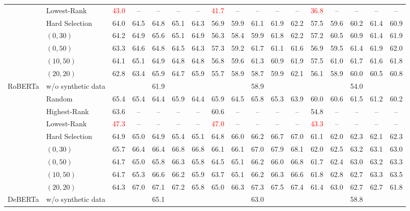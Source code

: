 \begin{table}[t]
\begin{tabular}{llccccccccccccccc}
 & Lowest-Rank & \textcolor{red}{43.0} & -- & -- & -- & -- & \textcolor{red}{41.7} & -- & -- & -- & -- & \textcolor{red}{36.8} & -- & -- & -- & -- \\
 & Hard Selection & 64.0 & 64.5 & 64.8 & 65.1 & 64.3 & 56.9 & 59.9 & 61.1 & 61.9 & 62.2 & 57.5 & 59.6 & 60.2 & 61.4 & 60.9 \\
 & $(0, 30)$ & 64.2 & 64.9 & 65.6 & 65.1 & 64.9 & 56.3 & 58.4 & 59.9 & 61.8 & 62.2 & 57.2 & 60.5 & 60.9 & 61.4 & 61.9 \\
 & $(0, 50)$ & 63.3 & 64.6 & 64.8 & 64.5 & 64.3 & 57.3 & 59.2 & 61.7 & 61.1 & 61.6 & 56.9 & 59.5 & 61.4 & 61.9 & 62.0 \\
 & $(10, 50)$ & 64.1 & 65.1 & 64.9 & 64.8 & 64.8 & 56.8 & 59.6 & 61.3 & 60.9 & 61.9 & 57.5 & 61.0 & 61.7 & 61.6 & 61.8 \\
 & $(20, 20)$ & 62.8 & 63.4 & 65.9 & 64.7 & 65.9 & 55.7 & 58.9 & 58.7 & 59.9 & 62.1 & 56.1 & 58.9 & 60.0 & 60.5 & 60.8 \\
\midrule
\multirow{9}{*}{RoBERTa} & w/o synthetic data & \multicolumn{5}{c}{61.9} & \multicolumn{5}{c}{58.9} & \multicolumn{5}{c}{54.0} \\
 & Random & 65.4 & 65.4 & 64.4 & 65.9 & 64.4 & 65.9 & 64.5 & 65.8 & 65.3 & 63.9 & 60.0 & 60.6 & 61.5 & 61.2 & 60.2 \\
 & Highest-Rank & 63.6 & -- & -- & -- & -- & 60.6 & -- & -- & -- & -- & 54.8 & -- & -- & -- & -- \\
 & Lowest-Rank & \textcolor{red}{47.3} & -- & -- & -- & -- & \textcolor{red}{47.0} & -- & -- & -- & -- & \textcolor{red}{43.3} & -- & -- & -- & -- \\
 & Hard Selection & 64.9 & 65.0 & 64.9 & 65.4 & 65.1 & 64.8 & 66.0 & 66.2 & 66.7 & 67.0 & 61.1 & 62.0 & 62.3 & 62.1 & 62.3 \\
 & $(0, 30)$ & 65.7 & 66.4 & 66.4 & 66.8 & 66.8 & 66.1 & 66.1 & 67.0 & 67.9 & 68.1 & 62.0 & 62.5 & 63.2 & 63.1 & 63.0 \\
 & $(0, 50)$ & 64.7 & 65.0 & 65.8 & 66.3 & 65.8 & 64.5 & 65.1 & 66.2 & 66.0 & 66.8 & 61.7 & 62.4 & 63.0 & 63.2 & 63.3 \\
 & $(10, 50)$ & 64.7 & 65.3 & 66.6 & 66.2 & 65.9 & 63.7 & 65.1 & 66.2 & 66.3 & 66.6 & 61.8 & 62.8 & 62.7 & 63.3 & 63.5 \\
 & $(20, 20)$ & 64.3 & 67.0 & 67.1 & 67.2 & 65.8 & 65.0 & 66.3 & 67.3 & 67.5 & 67.4 & 61.4 & 63.0 & 62.7 & 62.7 & 61.8 \\
\midrule
\multirow{9}{*}{DeBERTa} & w/o synthetic data & \multicolumn{5}{c}{65.1} & \multicolumn{5}{c}{63.0} & \multicolumn{5}{c}{58.8} \\

\end{tabular}
\end{table}
